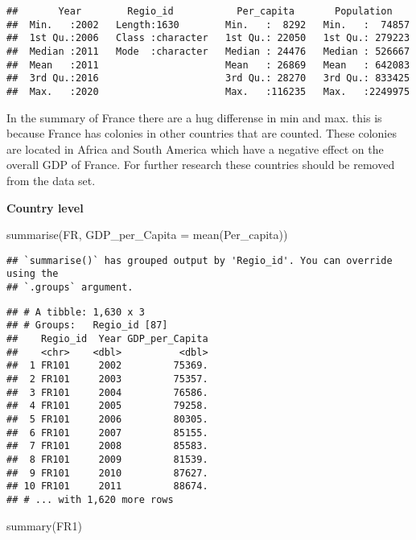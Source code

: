 \documentclass[
]{article}
\newenvironment{Shaded}{\begin{snugshade}}{\end{snugshade}}
\newcommand{\AttributeTok}[1]{\textcolor[rgb]{0.77,0.63,0.00}{#1}}
\newcommand{\FunctionTok}[1]{\textcolor[rgb]{0.00,0.00,0.00}{#1}}
\newcommand{\NormalTok}[1]{#1}
\begin{document}
\begin{verbatim}
##       Year        Regio_id           Per_capita       Population     
##  Min.   :2002   Length:1630        Min.   :  8292   Min.   :  74857  
##  1st Qu.:2006   Class :character   1st Qu.: 22050   1st Qu.: 279223  
##  Median :2011   Mode  :character   Median : 24476   Median : 526667  
##  Mean   :2011                      Mean   : 26869   Mean   : 642083  
##  3rd Qu.:2016                      3rd Qu.: 28270   3rd Qu.: 833425  
##  Max.   :2020                      Max.   :116235   Max.   :2249975
\end{verbatim}

In the summary of France there are a hug differense in min and max. this
is because France has colonies in other countries that are counted.
These colonies are located in Africa and South America which have a
negative effect on the overall GDP of France. For further research these
countries should be removed from the data set.

\textbf{Country level}

\begin{Shaded}
\begin{Highlighting}[]
    \FunctionTok{summarise}\NormalTok{(FR, }\AttributeTok{GDP\_per\_Capita =} \FunctionTok{mean}\NormalTok{(Per\_capita))}
\end{Highlighting}
\end{Shaded}

\begin{verbatim}
## `summarise()` has grouped output by 'Regio_id'. You can override using the
## `.groups` argument.
\end{verbatim}

\begin{verbatim}
## # A tibble: 1,630 x 3
## # Groups:   Regio_id [87]
##    Regio_id  Year GDP_per_Capita
##    <chr>    <dbl>          <dbl>
##  1 FR101     2002         75369.
##  2 FR101     2003         75357.
##  3 FR101     2004         76586.
##  4 FR101     2005         79258.
##  5 FR101     2006         80305.
##  6 FR101     2007         85155.
##  7 FR101     2008         85583.
##  8 FR101     2009         81539.
##  9 FR101     2010         87627.
## 10 FR101     2011         88674.
## # ... with 1,620 more rows
\end{verbatim}

\begin{Shaded}
\begin{Highlighting}[]
\FunctionTok{summary}\NormalTok{(FR1)}
\end{Highlighting}
\end{Shaded}
\end{document}
